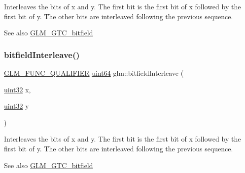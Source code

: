 Interleaves the bits of x and y. The first bit is the first bit of x followed by the first bit of y. The other bits are interleaved following the previous sequence.

\begin{DoxySeeAlso}{See also}
\hyperlink{group__gtc__bitfield}{G\+L\+M\+\_\+\+G\+T\+C\+\_\+bitfield} 
\end{DoxySeeAlso}
\mbox{\label{group__gtc__bitfield_ga2bc87fd66f6f8471c1a46888360cef12}} 
\subsubsection{\texorpdfstring{bitfield\+Interleave()}{bitfieldInterleave()}\hspace{0.1cm}{\footnotesize\ttfamily [6/16]}}
{\footnotesize\ttfamily \hyperlink{setup_8hpp_a33fdea6f91c5f834105f7415e2a64407}{G\+L\+M\+\_\+\+F\+U\+N\+C\+\_\+\+Q\+U\+A\+L\+I\+F\+I\+ER} \hyperlink{group__gtc__type__precision_gae3632bf9b37da66233d78930dd06378a}{uint64} glm\+::bitfield\+Interleave (\begin{DoxyParamCaption}\item[{\hyperlink{group__gtc__type__precision_ga202b6a53c105fcb7e531f9b443518451}{uint32}}]{x,  }\item[{\hyperlink{group__gtc__type__precision_ga202b6a53c105fcb7e531f9b443518451}{uint32}}]{y }\end{DoxyParamCaption})}

Interleaves the bits of x and y. The first bit is the first bit of x followed by the first bit of y. The other bits are interleaved following the previous sequence.

\begin{DoxySeeAlso}{See also}
\hyperlink{group__gtc__bitfield}{G\+L\+M\+\_\+\+G\+T\+C\+\_\+bitfield} 
\end{DoxySeeAlso}
\mbox{\label{group__gtc__bitfield_ga6dee2ce1c45805063bb7fc5f6fd8f5ca}} 
